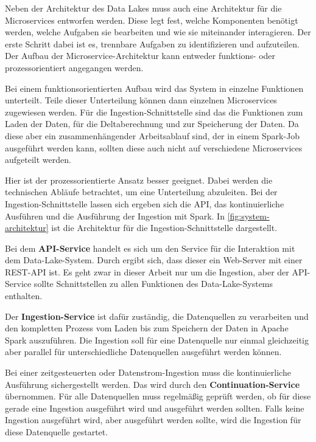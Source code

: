 Neben der Architektur des Data Lakes muss auch eine Architektur für die Microservices entworfen werden.
Diese legt fest, welche Komponenten benötigt werden, welche Aufgaben sie bearbeiten und wie sie miteinander interagieren.
Der erste Schritt dabei ist es, trennbare Aufgaben zu identifizieren und aufzuteilen.
Der Aufbau der Microservice-Architektur kann entweder funktions- oder prozessorientiert angegangen werden.

Bei einem funktionsorientierten Aufbau wird das System in einzelne Funktionen unterteilt.
Teile dieser Unterteilung können dann einzelnen Microservices zugewiesen werden.
Für die Ingestion-Schnittstelle sind das die Funktionen zum Laden der Daten, für die Deltaberechnung und zur Speicherung der Daten.
Da diese aber ein zusammenhängender Arbeitsablauf sind, der in einem Spark-Job ausgeführt werden kann, sollten diese auch nicht auf verschiedene Microservices aufgeteilt werden.

Hier ist der prozessorientierte Ansatz besser geeignet.
Dabei werden die technischen Abläufe betrachtet, um eine Unterteilung abzuleiten.
Bei der Ingestion-Schnittstelle lassen sich ergeben sich die API, das kontinuierliche Ausführen und die Ausführung der Ingestion mit Spark.
In \cref{fig:system-architektur} ist die Architektur für die Ingestion-Schnittstelle dargestellt.

Bei dem \textbf{API-Service} handelt es sich um den Service für die Interaktion mit dem Data-Lake-System.
Durch  ergibt sich, dass dieser ein Web-Server mit einer REST-API ist.
Es geht zwar in dieser Arbeit nur um die Ingestion, aber der API-Service sollte Schnittstellen zu allen Funktionen des Data-Lake-Systems enthalten.

Der \textbf{Ingestion-Service} ist dafür zuständig, die Datenquellen zu verarbeiten und den kompletten Prozess vom Laden bis zum Speichern der Daten in Apache Spark auszuführen.
Die Ingestion soll für eine Datenquelle nur einmal gleichzeitig aber parallel für unterschiedliche Datenquellen ausgeführt werden können.

Bei einer zeitgesteuerten oder Datenstrom-Ingestion muss die kontinuierliche Ausführung sichergestellt werden.
Das wird durch den \textbf{Continuation-Service} übernommen.
Für alle Datenquellen muss regelmäßig geprüft werden, ob für diese gerade eine Ingestion ausgeführt wird und ausgeführt werden sollten.
Falls keine Ingestion ausgeführt wird, aber ausgeführt werden sollte, wird die Ingestion für diese Datenquelle gestartet.

